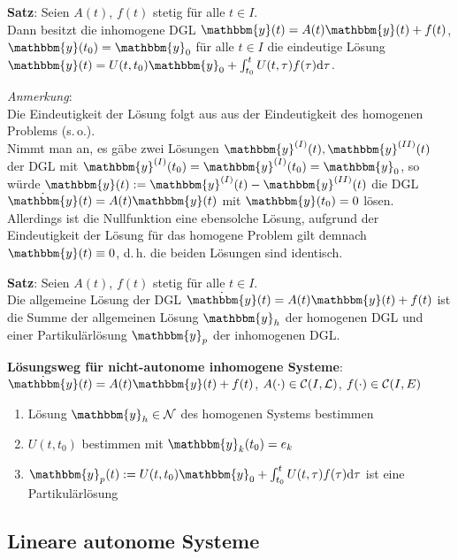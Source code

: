 \textbf{Satz}: Seien $A(t)$, $f(t)$ stetig für alle $t \in I$. \\
Dann besitzt die inhomogene DGL $\mathbbm{y}(t) = A(t) \mathbbm{y}(t) + f(t)$,
$\mathbbm{y}(t_0) = \mathbbm{y}_0$ für alle $ t \in I$
die eindeutige Lösung $\mathbbm{y}(t) = U(t, t_0) \mathbbm{y}_0 +
\int_{t_0}^t U(t, \tau) f(\tau) \d\tau$.

\emph{Anmerkung}: \\
Die Eindeutigkeit der Lösung folgt aus aus der Eindeutigkeit des homogenen
Problems (s.\,o.). \\
Nimmt man an, es gäbe zwei Lösungen
$\mathbbm{y}^{(I)}(t), \mathbbm{y}^{(II)}(t)$ der DGL mit
$\mathbbm{y}^{(I)}(t_0) = \mathbbm{y}^{(I)}(t_0) = \mathbbm{y}_0$,
so würde $\mathbbm{y}(t) := \mathbbm{y}^{(I)}(t) - \mathbbm{y}^{(II)}(t)$
die DGL $\dot{\mathbbm{y}}(t) = A(t) \mathbbm{y}(t)$ mit
$\mathbbm{y}(t_0) = 0$ lösen.
Allerdings ist die Nullfunktion eine ebensolche Lösung, aufgrund der
Eindeutigkeit der Lösung für das homogene Problem
gilt demnach $\mathbbm{y}(t) \equiv 0$, d.\,h.
die beiden Lösungen sind identisch.

\textbf{Satz}:
Seien $A(t)$, $f(t)$ stetig für alle $t \in I$. \\
Die allgemeine Lösung der DGL
$\dot{\mathbbm{y}}(t) = A(t) \mathbbm{y}(t) + f(t)$ ist die Summe
der allgemeinen Lösung $\mathbbm{y}_h$ der homogenen DGL
und einer Partikulärlösung $\mathbbm{y}_p$ der inhomogenen DGL.

\linie

\textbf{Lösungsweg für nicht-autonome inhomogene Systeme}: \\
$\dot{\mathbbm{y}}(t) = A(t) \mathbbm{y}(t) + f(t)$,
$A(\cdot) \in \mathcal{C}(I, \mathcal{L})$, $f(\cdot) \in \mathcal{C}(I, E)$
\begin{enumerate}
    \item
    Lösung $\mathbbm{y}_h \in \mathcal{N}$ des homogenen Systems bestimmen
    
    \item
    $U(t, t_0)$ bestimmen mit $\mathbbm{y}_k(t_0) = e_k$
    
    \item
    $\mathbbm{y}_p(t) := U(t, t_0) \mathbbm{y}_0 +
    \int_{t_0}^t U(t, \tau) f(\tau) \d\tau$
    ist eine Partikulärlösung
\end{enumerate}

\subsection{%
    Lineare autonome Systeme%
}

